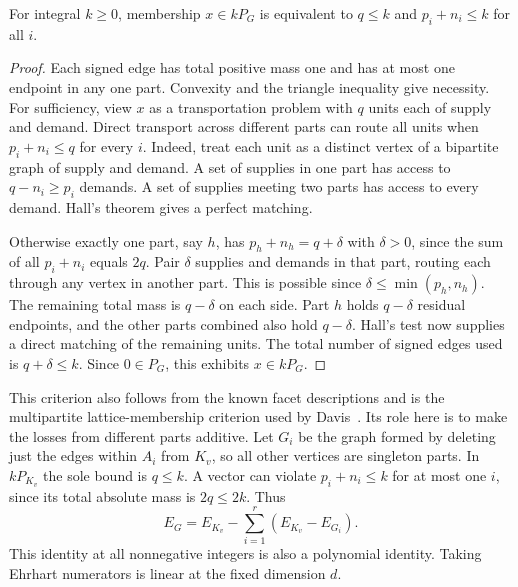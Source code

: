 \begin{lemma}\label{lem:gauge}
For integral $k\ge0$, membership $x\in kP_G$ is equivalent to
$q\le k$ and $p_i+n_i\le k$ for all $i$.
\end{lemma}
\begin{proof}
Each signed edge has total positive mass one and has at most one endpoint
in any one part. Convexity and the triangle inequality give necessity.
For sufficiency, view $x$ as a transportation problem with $q$ units each
of supply and demand. Direct transport across different parts can route
all units when $p_i+n_i\le q$ for every $i$. Indeed, treat each unit as a
distinct vertex of a bipartite graph of supply and demand. A set of
supplies in one part has access to $q-n_i\ge p_i$ demands. A set of
supplies meeting two parts has access to every demand. Hall's theorem
gives a perfect matching.

Otherwise exactly one part, say $h$, has $p_h+n_h=q+\delta$ with
$\delta>0$, since the sum of all $p_i+n_i$ equals $2q$. Pair $\delta$
supplies and demands in that part, routing each through any vertex in
another part. This is possible since $\delta\le\min(p_h,n_h)$.
The remaining total mass is $q-\delta$ on each side. Part $h$ holds
$q-\delta$ residual endpoints, and the other parts combined also hold
$q-\delta$. Hall's test now supplies a direct matching of the remaining
units. The total number of signed edges used is $q+\delta\le k$.
Since $0\in P_G$, this exhibits $x\in kP_G$.
\end{proof}

This criterion also follows from the known facet descriptions and is
the multipartite lattice-membership criterion used by Davis~\cite{davis}.
Its role here is to make the losses from different parts additive.
Let $G_i$ be the graph formed by deleting just the edges within $A_i$
from $K_v$, so all other vertices are singleton parts. In $kP_{K_v}$ the
sole bound is $q\le k$. A vector can violate $p_i+n_i\le k$ for at most
one $i$, since its total absolute mass is $2q\le2k$. Thus
\begin{equation}\label{eq:additive-defects}
 E_G=E_{K_v}-\sum_{i=1}^r(E_{K_v}-E_{G_i}).
\end{equation}
This identity at all nonnegative integers is also a polynomial identity.
Taking Ehrhart numerators is linear at the fixed dimension $d$.

